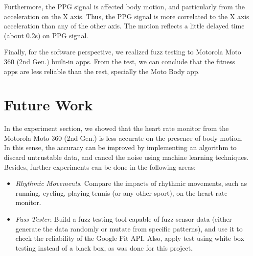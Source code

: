 \documentclass[11pt, draftclsnofoot, onecolumn]{IEEEtran}
\begin{document}
    Furthermore, the PPG signal is affected body motion, and particularly from the acceleration on the X axis. Thus, the PPG signal is more correlated to the X axis acceleration than any of the other axis. The motion reflects a little delayed time (about 0.2s) on PPG signal. 
    
    Finally, for the software perspective, we realized fuzz testing to Motorola Moto 360 (2nd Gen.) built-in apps. From the test, we can conclude that the fitness apps are less reliable than the rest, specially the Moto Body app.
    
    \section{Future Work} \label{sec:FutureWork}
    In the experiment section, we showed that the heart rate monitor from the Motorola Moto 360 (2nd Gen.) is less accurate on the presence of body motion. In this sense, the accuracy can be improved by implementing an algorithm to discard untrustable data, and cancel the noise using machine learning techniques. Besides, further experiments can be done in the following areas:
    \begin{itemize}
    \item \textit{Rhythmic Movements}. Compare the impacts of rhythmic movements, such as running, cycling, playing tennis (or any other sport), on the heart rate monitor.
    \item \textit{Fuss Tester}. Build a fuzz testing tool capable of fuzz sensor data (either generate the data randomly or mutate from specific patterns), and use it to check the reliability of the Google Fit API. Also, apply test using white box testing instead of a black box, as was done for this project.
    \end{itemize}
    
	
	
	
	
	
	
	
	
	
	
\end{document}
